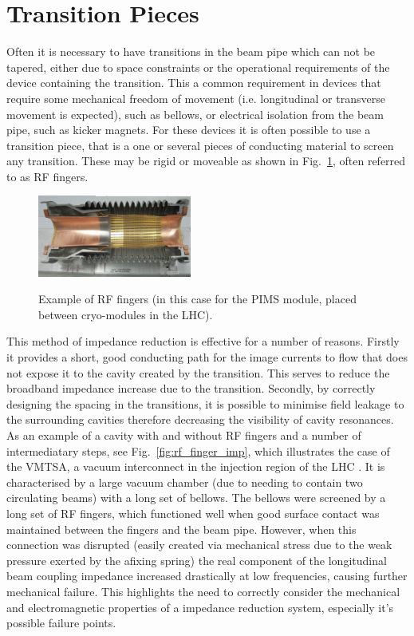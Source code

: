 \section{Transition Pieces}
\label{sec:transitions}

Often it is necessary to have transitions in the beam pipe which can not be tapered, either due to space constraints or the operational requirements of the device containing the transition. This a common requirement in devices that require some mechanical freedom of movement (i.e. longitudinal or transverse movement is expected), such as bellows, or electrical isolation from the beam pipe, such as kicker magnets. For these devices it is often possible to use a transition piece, that is a one or several pieces of conducting material to screen any transition. These may be rigid or moveable as shown in Fig.~\ref{fig:rf_fingers}, often referred to as RF fingers.

\begin{figure}
\begin{center}
\includegraphics[width=0.45\textwidth]{Beam_Coupling_Impedance_Reduction_Techniques/figures/pimsImage.png}
\label{fig:rf_fingers}
\end{center}
\caption{Example of RF fingers (in this case for the PIMS module, placed between cryo-modules in the LHC).}
\end{figure}


This method of impedance reduction is effective for a number of reasons. Firstly it provides a short, good conducting path for the image currents to flow that does not expose it to the cavity created by the transition. This serves to reduce the broadband impedance increase due to the transition. Secondly, by correctly designing the spacing in the transitions, it is possible to minimise field leakage to the surrounding cavities therefore decreasing the visibility of cavity resonances. As an example of a cavity with and without RF fingers and a number of intermediatary steps, see Fig.~\ref{fig:rf_finger_imp}, which illustrates the case of the VMTSA, a vacuum interconnect in the injection region of the LHC \cite{Salvant:VMTSA}. It is characterised by a large vacuum chamber (due to needing to contain two circulating beams) with a long set of bellows. The bellows were screened by a long set of RF fingers, which functioned well when good surface contact was maintained between the fingers and the beam pipe. However, when this connection was disrupted (easily created via mechanical stress due to the weak pressure exerted by the afixing spring) the real component of the longitudinal beam coupling impedance increased drastically at low frequencies, causing further mechanical failure. This highlights the need to correctly consider the mechanical and electromagnetic properties of a impedance reduction system, especially it's possible failure points.


